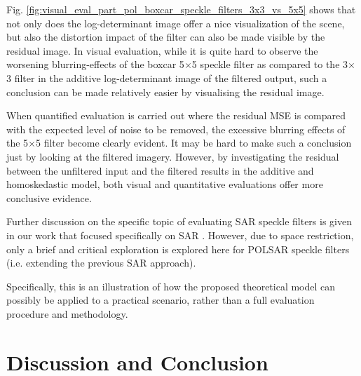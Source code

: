 \documentclass[journal]{IEEEtran}
\begin{document}
Fig. \ref{fig:visual_eval_part_pol_boxcar_speckle_filters_3x3_vs_5x5} shows that not only does the log-determinant image offer a nice visualization of the scene, 
  but also the distortion impact of the filter can also be made visible by the residual image.
In visual evaluation, while it is quite hard to observe the worsening blurring-effects of the boxcar 5$\times$5 speckle filter as compared to the 3$\times$3 filter
in the additive log-determinant image of the filtered output, 
  such a conclusion can be made relatively easier by visualising the residual image.

When quantified evaluation is carried out
  where the residual MSE is compared with the expected level of noise to be removed,
  the excessive blurring effects of the 5$\times$5 filter become clearly evident.
It may be hard to make such a conclusion just by looking at the filtered imagery.
However, by investigating the residual between the unfiltered input and the filtered results in the additive and homoskedastic model, both visual and quantitative evaluations offer more conclusive evidence.

Further discussion on the specific topic of evaluating SAR speckle filters is given in our work that focused specifically on SAR \cite{Le_2013_TGRS_SAR_MSE}.
However, due to space restriction, only a brief and critical exploration is explored here for POLSAR speckle filters (i.e. extending the previous SAR approach).

Specifically, this is an illustration of how the proposed theoretical model can possibly be applied to a practical scenario, rather than a full evaluation procedure and methodology.

\section{Discussion and Conclusion}
\label{sec:discussion_conclusion}
 

\end{document}
